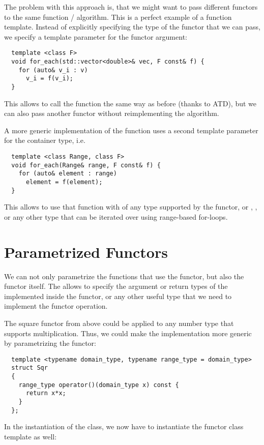 The problem with this approach is, that we might want to pass different functors to the same function / algorithm. This is a perfect example
of a function template. Instead of explicitly specifying the type of the functor that we can pass, we specify a template parameter for the functor
argument:
\begin{verbatim}
  template <class F>
  void for_each(std::vector<double>& vec, F const& f) {
    for (auto& v_i : v)
      v_i = f(v_i);
  }
\end{verbatim}

This allows to call the function  the same way as before (thanks to ATD), but we can also pass another functor without reimplementing the
algorithm.

\begin{rem}
  A more generic implementation of the  function uses a second template parameter for the container type, i.e.
  \begin{verbatim}
  template <class Range, class F>
  void for_each(Range& range, F const& f) {
    for (auto& element : range)
      element = f(element);
  }
  \end{verbatim}
  This allows to use that function with  of any type supported by the functor, or , , or
  any other type that can be iterated over using range-based for-loops.
\end{rem}


\section{Parametrized Functors}
We can not only parametrize the functions that use the functor, but also the functor itself. The allows to specify the argument or return types
of the  implemented inside the functor, or any other useful type that we need to implement the functor operation.

\begin{example}
  The square functor from above could be applied to any number type that supports multiplication. Thus, we could make the implementation more
  generic by parametrizing the functor:

  \begin{verbatim}
  template <typename domain_type, typename range_type = domain_type>
  struct Sqr
  {
    range_type operator()(domain_type x) const {
      return x*x;
    }
  };
  \end{verbatim}

  In the instantiation of the class, we now have to instantiate the functor class template as well:
\end{example}

